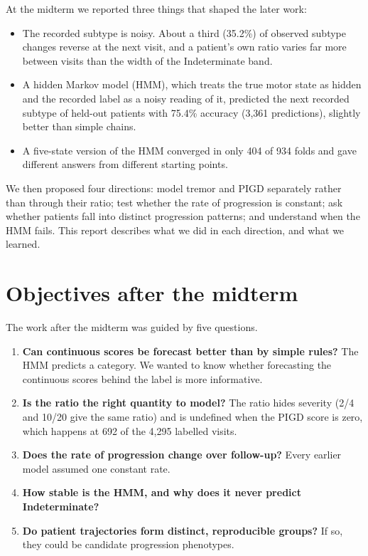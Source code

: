 \documentclass[11pt,a4paper]{article}
\begin{document}
At the midterm we reported three things that shaped the later work:

\begin{itemize}
  \item The recorded subtype is noisy. About a third (35.2\%) of observed subtype
        changes reverse at the next visit, and a patient's own ratio varies far more
        between visits than the width of the Indeterminate band.
  \item A hidden Markov model (HMM), which treats the true motor state as hidden
        and the recorded label as a noisy reading of it, predicted the next
        recorded subtype of held-out patients with 75.4\% accuracy
        (3,361 predictions), slightly better than simple chains.
  \item A five-state version of the HMM converged in only 404 of 934 folds and
        gave different answers from different starting points.
\end{itemize}

We then proposed four directions: model tremor and PIGD separately rather
than through their ratio; test whether the rate of progression is constant;
ask whether patients fall into distinct progression patterns; and understand
when the HMM fails. This report describes what we did in each direction, and
what we learned.

\section{Objectives after the midterm}

The work after the midterm was guided by five questions.

\begin{enumerate}
  \item \textbf{Can continuous scores be forecast better than by simple rules?}
        The HMM predicts a category. We wanted to know whether forecasting the
        continuous scores behind the label is more informative.
  \item \textbf{Is the ratio the right quantity to model?} The ratio hides
        severity (2/4 and 10/20 give the same ratio) and is undefined when the
        PIGD score is zero, which happens at 692 of the 4,295 labelled visits.
  \item \textbf{Does the rate of progression change over follow-up?} Every
        earlier model assumed one constant rate.
  \item \textbf{How stable is the HMM, and why does it never predict
        Indeterminate?}
  \item \textbf{Do patient trajectories form distinct, reproducible groups?}
        If so, they could be candidate progression phenotypes.
\end{enumerate}
\end{document}
